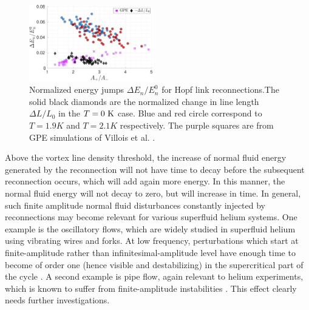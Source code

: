 \documentclass[
  reprint,
superscriptaddress,
 amsmath,amssymb,
 aps,
prb,
]{revtex4-2}
\begin{document}
\begin{figure}
	\centering
	\includegraphics*[width=0.48\textwidth]{energy-jump.pdf}
	\caption{Normalized energy jumps $\Delta E_n/E_n^0$ for Hopf link 
reconnections.The solid black diamonds are the normalized change in line length $\Delta L/L_0$ in the
$T=0~\rm K$ case. Blue and red circle correspond to $T=1.9K$ and $T=2.1K$ respectively. The purple squares are from GPE simulations of
Villois et al. \cite{villoisIrreversibleDynamicsVortex2020}.}
	\label{fig:energy-jumps}
\end{figure}

Above the vortex line density threshold, the increase of normal fluid energy generated by the reconnection will not have time to decay before the subsequent reconnection occurs, which will add again more energy. In this manner, the normal fluid energy will not decay to zero, but will increase in time. In general, such finite amplitude normal fluid disturbances constantly injected by reconnections may become relevant for various superfluid helium systems. One example is the oscillatory flows, which are widely studied in superfluid helium using vibrating wires and forks. At low frequency, perturbations which start at finite-amplitude rather than infinitesimal-amplitude level have enough time to become of order one (hence visible and destabilizing) in the supercritical part of the cycle \cite{barenghi1989modulated}. A second example is pipe flow, again relevant to helium experiments, which is known to suffer from finite-amplitude instabilities \cite{peixinho2007finite}. This effect clearly needs further investigations.
\end{document}
